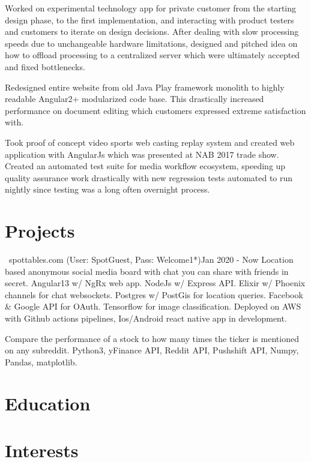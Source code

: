 \documentclass{my_resume}
\begin{document}
\workitemstwo
{Worked on experimental technology app for private customer from the starting design phase, to the first implementation, and interacting
with product testers and customers to iterate on design decisions.}
{After dealing with slow processing speeds due to unchangeable hardware limitations, designed and pitched idea on how to offload
processing to a centralized server which were ultimately accepted and fixed bottlenecks.}

\workitemsone
{Redesigned entire website from old Java Play framework monolith to highly readable Angular2+ modularized code base. This drastically increased performance
 on document editing which customers expressed extreme satisfaction with.}

\workitemstwo
{Took proof of concept video sports web casting replay system and created web application with AngularJs
 which was presented at NAB 2017 trade show.}
{Created an automated test suite for media workflow ecosystem, speeding up quality assurance work drastically with new regression tests
 automated to run nightly since testing was a long often overnight process.}

 \section{Projects}

{\faChrome~spottables.com (User: SpotGuest, Pass: Welcome1*)}{Jan 2020 - Now}
\projectitem
{Location based anonymous social media board with chat you can share with friends in secret.}
{Angular13 w/ NgRx web app. NodeJs w/ Express API. Elixir w/ Phoenix channels for chat websockets. Postgres w/ PostGis for location queries. Facebook \& Google API for OAuth. Tensorflow for image classification. Deployed on AWS with Github actions pipelines, Ios/Android react native app in development.}

\projectitem
{Compare the performance of a stock to how many times the ticker is mentioned on any subreddit.}
{Python3, yFinance API, Reddit API, Pushshift API, Numpy, Pandas, matplotlib.}

\section{Education}

\section{Interests}
\end{document}
